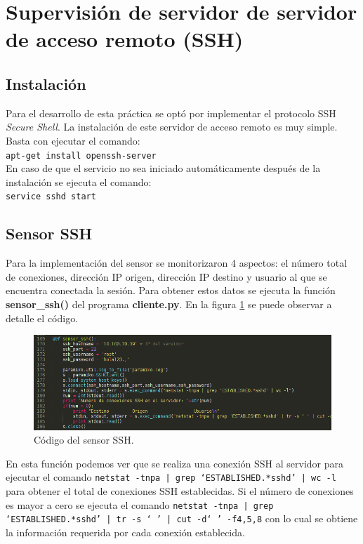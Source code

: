 \section{Supervisión de servidor de servidor de acceso remoto (SSH)}
\subsection{Instalación}
Para el desarrollo de esta práctica se optó por implementar el protocolo SSH \textit{Secure Shell}. La instalación de este servidor de acceso remoto es muy simple. Basta con ejecutar el comando:\\
\texttt{apt-get install openssh-server}\\

En caso de que el servicio no sea iniciado automáticamente después de la instalación se ejecuta el comando:\\
\texttt{service sshd start}\\
\subsection{Sensor SSH}
Para la implementación del sensor se monitorizaron 4 aspectos: el número total de conexiones, dirección IP origen, dirección IP destino y usuario al que se encuentra conectada la sesión.
Para obtener estos datos se ejecuta la función \textbf{sensor\_ssh()} del programa \textbf{cliente.py}. En la figura \ref{image:sensorsshcodigo} se puede observar a detalle el código.

\FloatBarrier
\begin{figure}[htbp!]
		\centering
			\includegraphics[width=.65 \textwidth]{images/sensorsshcodigo}
		\caption{Código del sensor SSH.}
		\label{image:sensorsshcodigo}
\end{figure}
\FloatBarrier

En esta función podemos ver que se realiza una conexión SSH al servidor para ejecutar el comando \texttt{netstat -tnpa | grep `ESTABLISHED.*sshd' | wc -l } para obtener el total de conexiones SSH establecidas. Si el número de conexiones es mayor a cero se ejecuta el comando \texttt{netstat -tnpa | grep `ESTABLISHED.*sshd' | tr -s ` ' | cut -d` ' -f4,5,8} con lo cual se obtiene la información requerida por cada conexión establecida.

